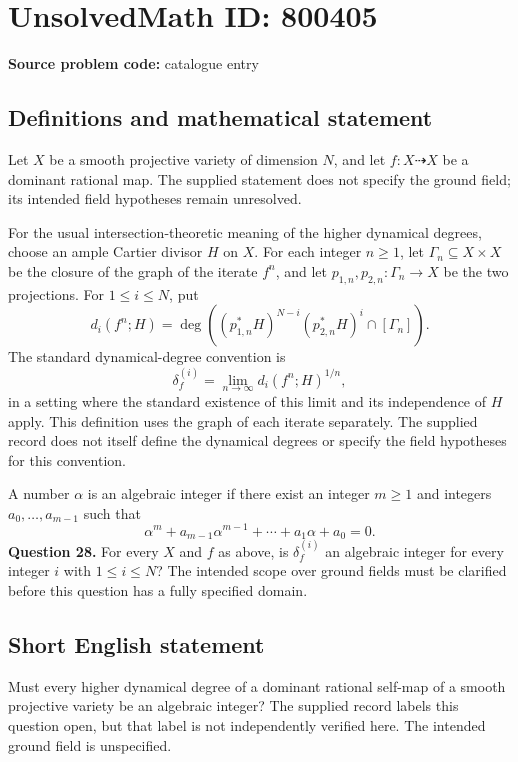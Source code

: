 \documentclass[11pt]{article}
\begin{document}
\section*{UnsolvedMath ID: 800405}
\textbf{Source problem code:} catalogue entry
\subsection{Definitions and mathematical statement}
Let \(X\) be a smooth projective variety of dimension \(N\), and let \(f\colon X\dashrightarrow X\) be a dominant rational map. The supplied statement does not specify the ground field; its intended field hypotheses remain unresolved.

For the usual intersection-theoretic meaning of the higher dynamical degrees, choose an ample Cartier divisor \(H\) on \(X\). For each integer \(n\geq 1\), let \(\Gamma_n\subseteq X\times X\) be the closure of the graph of the iterate \(f^n\), and let \(p_{1,n},p_{2,n}\colon\Gamma_n\to X\) be the two projections. For \(1\leq i\leq N\), put
\[
 d_i(f^n;H)=\deg\!\left((p_{1,n}^{*}H)^{N-i}(p_{2,n}^{*}H)^i\cap[\Gamma_n]\right).
\]
The standard dynamical-degree convention is
\[
 \delta_f^{(i)}=\lim_{n\to\infty}d_i(f^n;H)^{1/n},
\]
in a setting where the standard existence of this limit and its independence of \(H\) apply. This definition uses the graph of each iterate separately. The supplied record does not itself define the dynamical degrees or specify the field hypotheses for this convention.

A number \(\alpha\) is an algebraic integer if there exist an integer \(m\geq 1\) and integers \(a_0,\ldots,a_{m-1}\) such that
\[
 \alpha^m+a_{m-1}\alpha^{m-1}+\cdots+a_1\alpha+a_0=0.
\]
\textbf{Question 28.} For every \(X\) and \(f\) as above, is \(\delta_f^{(i)}\) an algebraic integer for every integer \(i\) with \(1\leq i\leq N\)? The intended scope over ground fields must be clarified before this question has a fully specified domain.
\subsection{Short English statement}
Must every higher dynamical degree of a dominant rational self-map of a smooth projective variety be an algebraic integer? The supplied record labels this question open, but that label is not independently verified here. The intended ground field is unspecified.
\end{document}

